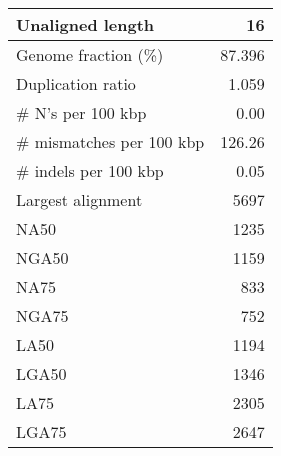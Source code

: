 \documentclass[12pt,a4paper]{article}
\begin{document}
\begin{table}[ht]
\begin{center}
\begin{tabular}{|l*{1}{|r}|}
Unaligned length & 16 \\ \hline
Genome fraction (\%) & 87.396 \\ \hline
Duplication ratio & 1.059 \\ \hline
\# N's per 100 kbp & 0.00 \\ \hline
\# mismatches per 100 kbp & 126.26 \\ \hline
\# indels per 100 kbp & 0.05 \\ \hline
Largest alignment & 5697 \\ \hline
NA50 & 1235 \\ \hline
NGA50 & 1159 \\ \hline
NA75 & 833 \\ \hline
NGA75 & 752 \\ \hline
LA50 & 1194 \\ \hline
LGA50 & 1346 \\ \hline
LA75 & 2305 \\ \hline
LGA75 & 2647 \\ \hline
\end{tabular}
\end{center}
\end{table}
\end{document}
